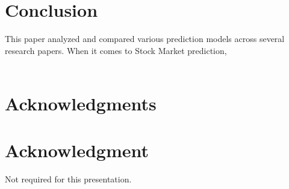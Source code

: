 \documentclass[conference]{IEEEtran}
\begin{document}
\section{Conclusion}
This paper analyzed and compared various prediction models across several research papers. When it comes to Stock Market prediction,
\\\\
\ifCLASSOPTIONcompsoc
  \section*{Acknowledgments}
\else
  \section*{Acknowledgment}
\fi
Not required for this presentation.



\end{document}
